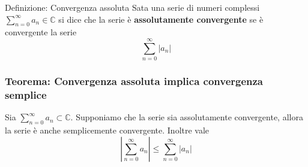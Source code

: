 \documentclass[x11names]{article}
\begin{document}
	\begin{center}
		\colorbox{myblue}{\begin{minipage}{5.75in}
				\begin{blues}{Definizione: Convergenza assoluta}
					Sata una serie di numeri complessi \(\sum_{n=0}^{\infty} a_{n} \in \mathbb{C}\) si dice che la serie è \textbf{assolutamente convergente} se è convergente la serie
					\[ 
					\sum_{n=0}^{\infty} |a_{n}|
					\]
				\end{blues}
		\end{minipage}}       
	\end{center}
	\begin{center}
		\colorbox{myred}{\begin{minipage}{5.75in}
				\begin{redes}{}
					\subsubsection{Teorema: Convergenza assoluta implica convergenza semplice}
					Sia \(\sum_{n=0}^{\infty} a_{n} \subset \mathbb{C}\). Supponiamo che la serie sia assolutamente convergente, allora la serie è anche semplicemente convergente. Inoltre vale
					\[ 
					\left|\sum_{n=0}^{\infty} a_{n}\right| \leq \sum_{n=0}^{\infty} |a_{n}|
					\]
				\end{redes}
		\end{minipage}}        
	\end{center}
\end{document}
